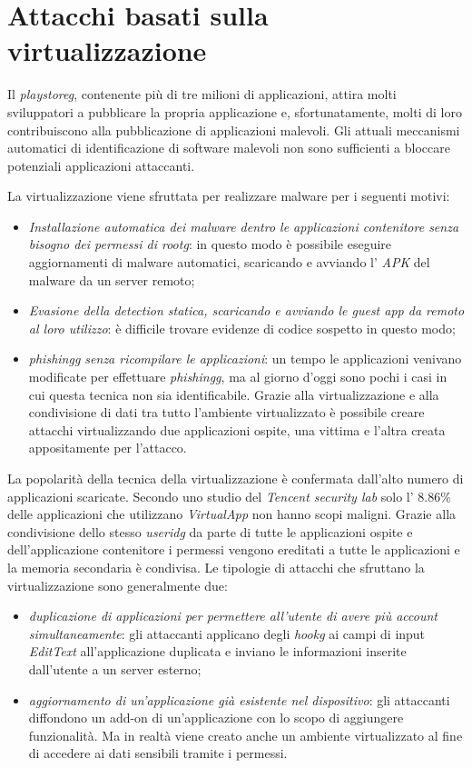 \newpage
\section{Attacchi basati sulla virtualizzazione}
\label{sec:attacchi_virt}

Il \emph{\gls{playstoreg}}, contenente più di tre milioni di applicazioni, attira molti sviluppatori a pubblicare la propria applicazione e, sfortunatamente, molti di loro contribuiscono alla pubblicazione di applicazioni malevoli.
Gli attuali meccanismi automatici di identificazione di software malevoli non sono sufficienti a bloccare potenziali applicazioni attaccanti. 

La virtualizzazione viene sfruttata per realizzare malware per i seguenti motivi:
\begin{itemize}
\item \emph{Installazione automatica dei malware dentro le applicazioni contenitore senza bisogno dei permessi di \gls{rootg}\glsfirstoccur}: in questo modo è possibile eseguire aggiornamenti di malware automatici, scaricando e avviando l' \emph{APK} del malware da un server remoto;
\item \emph{Evasione della detection statica, scaricando e avviando le guest app da remoto al loro utilizzo}: è difficile trovare evidenze di codice sospetto in questo modo;
\item \emph{\gls{phishingg} senza ricompilare le applicazioni}: un tempo le applicazioni venivano modificate per effettuare \emph{\gls{phishingg}}, ma al giorno d'oggi sono pochi i casi in cui questa tecnica non sia identificabile. Grazie alla virtualizzazione e alla condivisione di dati tra tutto l'ambiente virtualizzato è possibile creare attacchi virtualizzando due applicazioni ospite, una vittima e l'altra creata appositamente per l'attacco.
\end{itemize}


La popolarità della tecnica della virtualizzazione è confermata dall'alto numero di applicazioni scaricate.
Secondo uno studio del \emph{Tencent security lab}\cite{TencentSecLab} solo l' 8.86\% delle applicazioni che utilizzano \emph{VirtualApp} non hanno scopi maligni.
Grazie alla condivisione dello stesso \emph{\gls{useridg}} da parte di tutte le applicazioni ospite e dell'applicazione contenitore i permessi vengono ereditati a tutte le applicazioni e la memoria secondaria è condivisa.
Le tipologie di attacchi che sfruttano la virtualizzazione sono generalmente due:
\begin{itemize}
    \item \emph{duplicazione di applicazioni per permettere all'utente di avere più account simultaneamente}: gli attaccanti applicano degli \emph{\gls{hookg}} ai campi di input \emph{EditText} all'applicazione duplicata e inviano le informazioni inserite dall'utente a un server esterno;
    \item \emph{aggiornamento di un'applicazione già esistente nel dispositivo}: gli attaccanti diffondono un add-on di un'applicazione con lo scopo di aggiungere funzionalità. Ma in realtà viene creato anche un ambiente virtualizzato al fine di accedere ai dati sensibili tramite i permessi.
\end{itemize}


